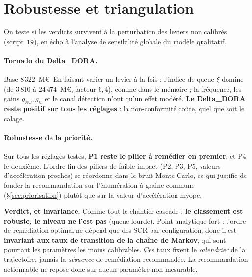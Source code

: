 \documentclass[11pt,a4paper]{article}
\begin{document}
\section{Robustesse et triangulation}
\label{sec:robustesse}

On teste si les verdicts survivent à la perturbation des leviers non calibrés
(script~\texttt{19}), en écho à l'analyse de sensibilité globale du modèle qualitatif.

\paragraph{Tornado du Delta\_DORA.} Base $8\,322$~M\euro. En faisant varier un levier à la
fois : l'indice de queue $\xi$ domine (de $3\,810$ à $24\,474$~M\euro, facteur $6{,}4$), comme
dans le mémoire ; la fréquence, les gains $g_{\text{NC}},g_{\text{C}}$ et le canal détection
n'ont qu'un effet modéré. \textbf{Le Delta\_DORA reste positif sur tous les réglages} : la
non-conformité coûte, quel que soit le calage.

\paragraph{Robustesse de la priorité.} Sur tous les réglages testés, \textbf{P1 reste le
pilier à remédier en premier}, et P4 le deuxième. L'ordre fin des piliers de faible impact
(P2, P3, P5, valeurs d'accélération proches) se réordonne dans le bruit Monte-Carlo, ce qui
justifie de fonder la recommandation sur l'énumération à graine commune (\S\ref{sec:priorisation})
plutôt que sur la valeur d'accélération myope.

\begin{cle}
\textbf{Verdict, et invariance.} Comme tout le chantier cascade : \textbf{le classement est
robuste, le niveau ne l'est pas} (queue lourde). Point analytique fort : l'ordre de
remédiation optimal ne dépend que des SCR par configuration, donc il est \textbf{invariant aux
taux de transition de la chaîne de Markov}, qui sont pourtant les paramètres les moins
calibrables. Ces taux fixent le \emph{calendrier} de la trajectoire, jamais la \emph{séquence}
de remédiation recommandée. La recommandation actionnable ne repose donc sur aucun paramètre
non mesurable.
\end{cle}
\end{document}
